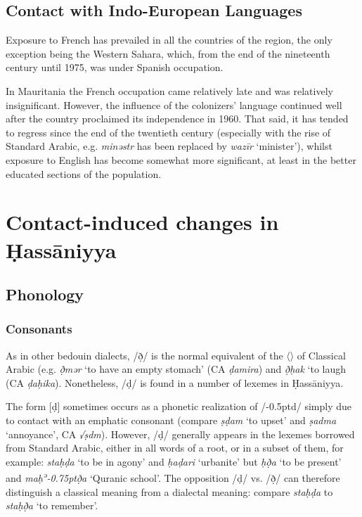 \documentclass[output=paper]{langsci/langscibook}
\begin{document}
\subsection{Contact with Indo-European Languages} %

Exposure to French has prevailed in all the countries of the region, the only exception being the Western Sahara, which, from the end of the nineteenth century until 1975, was under Spanish occupation.

In Mauritania the French occupation came relatively late and was relatively insignificant. However, the influence of the colonizers’ language continued well after the country proclaimed its independence in 1960. That said, it has tended to regress since the end of the twentieth century (especially with the rise of Standard Arabic, e.g. \textit{minəstr} has been replaced by \textit{wazīr} ‘minister’), whilst exposure to English has become somewhat more significant, at least in the better educated sections of the population.

\section{Contact-induced changes in  Ḥassāniyya} %

\subsection{Phonology} %

\subsubsection{Consonants} %
As in other bedouin dialects, /ð̣/ is the normal equivalent of the 〈〉 of Classical Arabic (e.g. \textit{ð̣mər} ‘to have an empty stomach’ (CA \textit{ḍamira}) and \textit{ð̣ḥak} ‘to laugh (CA \textit{ḍaḥika}). Nonetheless, /ḍ/ is found in a number of lexemes in Ḥassāniyya. 

The form [ḍ] sometimes occurs as a phonetic realization of /\kern -0.5ptd/ simply due to contact with an emphatic consonant (compare \textit{ṣḍam} ‘to upset’ and \textit{ṣadma} ‘annoyance’, CA \textit{√ṣdm}). However, /ḍ/ generally appears in the lexemes borrowed from Standard Arabic, either in all words of a root, or in a subset of them, for example: \textit{staḥḍa{\R}} ‘to be in agony’ and \textit{ḥaḍari} ‘urbanite’ but \textit{ḥð̣a{\R}} ‘to be present’ and \textit{maḥ\textsuperscript{ə}\kern -0.75ptð̣{\R}a} ‘Quranic school’. The opposition /ḍ/ vs. /ð̣/ can therefore distinguish a classical meaning from a dialectal meaning: compare \textit{staḥḍa{\R}} to \textit{staḥð̣a{\R}} ‘to remember’.
\end{document}
